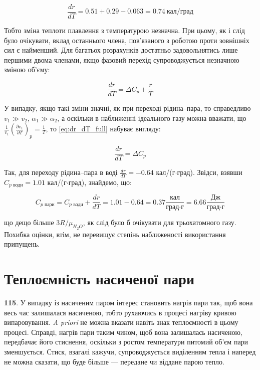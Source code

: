 \begin{equation}\label{eq:dr_dT_water}
\frac{dr}{dT} = 0.51 + 0.29 - 0.063 = 0.74\ \text{кал/град}
\end{equation}

Тобто зміна теплоти плавлення з температурою незначна. При цьому, як і слід було очікувати, вклад
останнього члена, пов'язаного з роботою проти зовнішніх сил є найменший. Для багатьох розрахунків
достатньо задовольнятись лише першими двома членами, якщо фазовий перехід супроводжується незначною
зміною об'єму:

\begin{equation}\label{eq:dr_dT_simple}
\frac{dr}{dT} = \Delta C_p + \frac{r}{T}
\end{equation}

У випадку, якщо такі зміни значні, як при переході рідина--пара, то справедливо $v_1 \gg v_2$,
$\alpha_1 \gg \alpha_2$, а оскільки в наближенні ідеального газу можна вважати, що
$\frac{1}{v_1}\left(\frac{\partial v_1}{\partial T}\right)_p = \frac{1}{T}$, то \eqref{eq:dr_dT_full}
набуває вигляду:

\begin{equation}\label{eq:dr_dT_gas}
\frac{dr}{dT} = \Delta C_p
\end{equation}

Так, для переходу рідина--пара в воді $\frac{dr}{dT} = -0.64$ кал/(г$\cdot$град). Звідси, взявши
$C_{p\text{ води}} = 1.01$ кал/(г$\cdot$град), знайдемо, що:

\begin{equation*}
C_{p\text{ пари}} = C_{p\text{ води}} + \frac{dr}{dT} = 1.01 - 0.64 =
0.37\frac{\text{кал}}{\text{град}\cdot\text{г}} = 6.66\frac{\text{Дж}}{\text{град}\cdot\text{г}}
\end{equation*}

що дещо більше $3R/\mu_{H_2O}$, як слід було б очікувати для трьохатомного газу. Похибка оцінки, втім,
не перевищує степінь наближеності використання припущень.

\section{Теплоємність насиченої пари}

\textbf{115}. У випадку із насиченим паром інтерес становить нагрів пари так, щоб вона весь час
залишалася насиченою, тобто рухаючись в процесі нагріву кривою випаровування. \emph{A priori} не можна
вказати навіть знак теплоємності в цьому процесі. Справді, нагрів пари таким чином, щоб вона
залишалась насиченою, передбачає його стиснення, оскільки з ростом температури питомий об'єм пари
зменшується. Стиск, взагалі кажучи, супроводжується виділенням тепла і наперед не можна сказати, що
буде більше --- передане чи віддане парою тепло.

